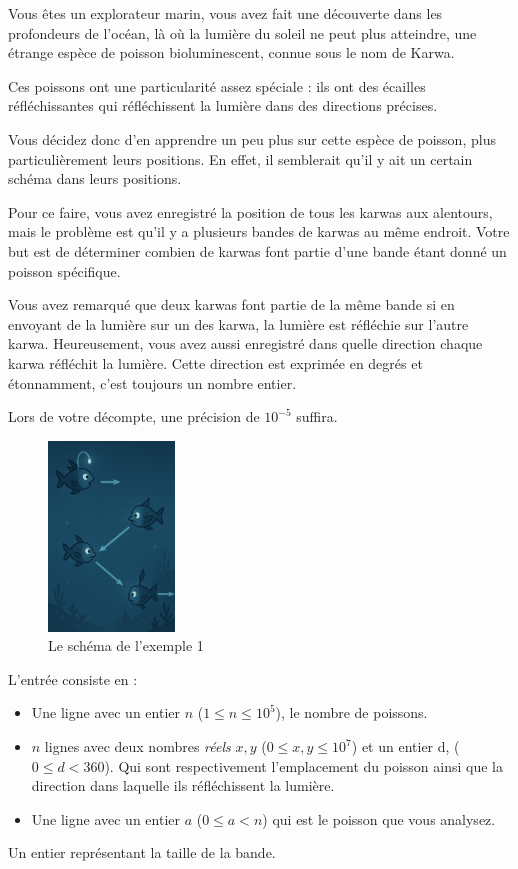 \problemname{}


Vous êtes un explorateur marin, vous avez fait une découverte dans les profondeurs de l'océan, là où la lumière du soleil ne peut plus atteindre, une étrange espèce de poisson bioluminescent, connue sous le nom de Karwa.

Ces poissons ont une particularité assez spéciale : ils ont des écailles réfléchissantes qui réfléchissent la lumière dans des directions précises.

Vous décidez donc d'en apprendre un peu plus sur cette espèce de poisson, plus particulièrement leurs positions. En effet, il semblerait qu'il y ait un certain schéma dans leurs positions.

Pour ce faire, vous avez enregistré la position de tous les karwas aux alentours, mais le problème est qu'il y a plusieurs bandes de karwas au même endroit. Votre but est de déterminer combien de karwas font partie d'une bande étant donné un poisson spécifique.

Vous avez remarqué que deux karwas font partie de la même bande si en envoyant de la lumière sur un des karwa, la lumière est réfléchie sur l'autre karwa. Heureusement, vous avez aussi enregistré dans quelle direction chaque karwa réfléchit la lumière. Cette direction est exprimée en degrés et étonnamment, c'est toujours un nombre entier.

Lors de votre décompte, une précision de $10^{-5}$ suffira.

\smallskip
\begin{figure}[h]
    \centering
    \includegraphics[width=0.3\textwidth]{sample1.png}
    \caption{Le schéma de l'exemple 1}
\end{figure}

\begin{Input}
    L'entrée consiste en :
    \begin{itemize}
        \item Une ligne avec un entier $n$ ($1 \leq n \leq 10^{5}$), le nombre de poissons.
        \item $n$ lignes avec deux nombres \emph{réels} $x, y$ ($0 \leq x,y \leq {10^{7}}$) et un entier d, ($0 \leq d < 360$). Qui sont respectivement l'emplacement du poisson ainsi que la direction dans laquelle ils réfléchissent la lumière.
        \item Une ligne avec un entier $a$ ($0 \leq a < n$) qui est le poisson que vous analysez.
    \end{itemize}
\end{Input}

\begin{Output}
    Un entier représentant la taille de la bande.
\end{Output}
